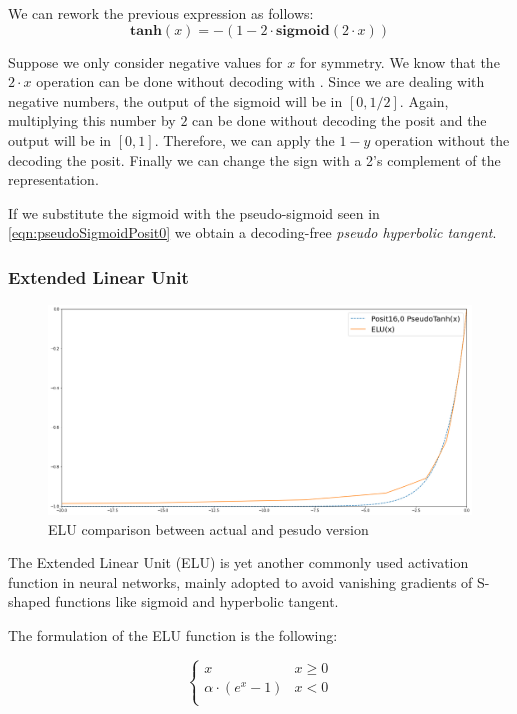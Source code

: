 We can rework the previous expression as follows:
\begin{equation}
    \mathbf{tanh}(x) = - ( 1 - 2\cdot \mathbf{sigmoid}(2\cdot x))
\end{equation}

Suppose we only consider negative values for $x$ for symmetry. We know that the $2\cdot x$ operation can be done without decoding with . Since we are dealing with negative numbers, the output of the sigmoid will be in $[0,1/2]$. Again, multiplying this number by $2$ can be done without decoding the posit and the output will be in $[0,1]$. Therefore, we can apply the $1-y$ operation without the decoding the posit. Finally we can change the sign with a 2's complement of the representation.

If we substitute the sigmoid with the pseudo-sigmoid seen in \eqref{eqn:pseudoSigmoidPosit0} we obtain a decoding-free \textit{pseudo hyperbolic tangent}.

\subsubsection{Extended Linear Unit}

\begin{figure}
    \centering
    \includegraphics[width=\linewidth]{img/eluPosit160.png}
    \caption{ELU comparison between actual and pesudo version}
    \label{fig:pseudoEluPosit0}
\end{figure}


The Extended Linear Unit (ELU) is yet another commonly used activation function in neural networks, mainly adopted to avoid vanishing gradients of S-shaped functions like sigmoid and hyperbolic tangent.

The formulation of the ELU function is the following:

\begin{equation}
\left\{\begin{matrix}
x & x \geq 0 \\
\alpha \cdot (e^x - 1) & x < 0  \\
\end{matrix}\right.
\end{equation}


